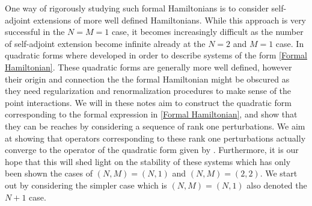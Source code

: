 \documentclass[a4paper,11pt]{article}
\begin{document}
One way of rigorously studying such formal Hamiltonians is to consider self-adjoint extensions of more well defined Hamiltonians. While this approach is very successful in the $ N=M=1 $ case, it becomes increasingly difficult as the number of self-adjoint extension become infinite already at the $ N=2 $ and $ M=1 $ case.  
In \cite{FINCO2012131} quadratic forms where developed in order to describe systems of the form \eqref{Formal Hamiltonian}. These quadratic forms are generally more well defined, however their origin and connection the the formal Hamiltonian might be obscured as they need regularization and renormalization procedures to make sense of the point interactions. We will in these notes aim to construct the quadratic form corresponding to the formal expression in \eqref{Formal Hamiltonian}, and show that they can be reaches by considering a sequence of rank one perturbations. We aim at showing that operators corresponding to these rank one perturbations actually converge to the operator of the quadratic form given by \cite{FINCO2012131}. Furthermore, it is our hope that this will shed light on the stability of these systems which has only been shown the cases of  $ (N,M)=(N,1) $ and $ (N,M)=(2,2) $.
We start out by considering the simpler case which is $ (N,M)=(N,1) $ also denoted the $ N+1 $ case.
\end{document}
